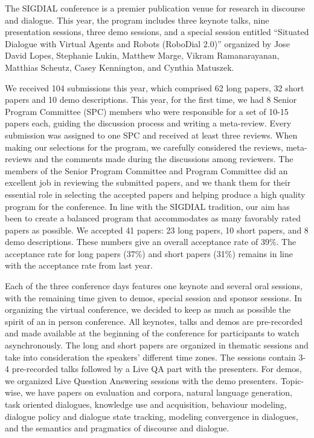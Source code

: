 The SIGDIAL conference is a premier publication venue for research in discourse and dialogue. This year, the program includes three keynote talks, nine presentation sessions, three demo sessions, and a special session entitled ``Situated Dialogue with Virtual Agents and Robots (RoboDial 2.0)'' organized by Jose David Lopes, Stephanie Lukin, Matthew Marge, Vikram Ramanarayanan,  Matthias Scheutz, Casey Kennington, and Cynthia Matuszek.

We received 104 submissions this year, which comprised 62 long papers, 32 short papers and 10 demo descriptions. This year, for the first time, we had 8 Senior Program Committee (SPC) members who were responsible for a set of 10-15 papers each, guiding the discussion process and writing a meta-review. Every submission was assigned to one SPC and received at least three reviews. When making our selections for the program, we carefully considered the reviews, meta-reviews and the comments made during the discussions among reviewers. The members of the Senior Program Committee and Program Committee did an excellent job in reviewing the submitted papers, and we thank them for their essential role in selecting the accepted papers and helping produce a high quality program for the conference. In line with the SIGDIAL tradition, our aim has been to create a balanced program that accommodates as many favorably rated papers as possible. We accepted 41 papers: 23 long papers, 10 short papers, and 8 demo descriptions. These numbers give an overall acceptance rate of 39\%. The acceptance rate for long papers (37\%) and short papers (31\%) remains in line with the acceptance rate from last year.

Each of the three conference days features one keynote and several oral sessions, with the remaining time given to demos, special session and sponsor sessions. In organizing the virtual conference, we decided to keep as much as possible the spirit of an in person conference. All keynotes, talks and demos are pre-recorded and made available at the beginning of the conference for participants to watch asynchronously. The long and short papers are organized in thematic sessions and take into consideration the speakers' different time zones.  The sessions contain 3-4 pre-recorded talks followed by a Live QA part with the presenters. For demos, we organized Live Question Answering sessions with the demo presenters. Topic-wise, we have papers on evaluation and corpora, natural language generation, task oriented dialogues, knowledge use and acquisition,  behaviour modeling, dialogue policy and dialogue state tracking, modeling convergence in dialogues, and the semantics and pragmatics of discourse and dialogue. 

